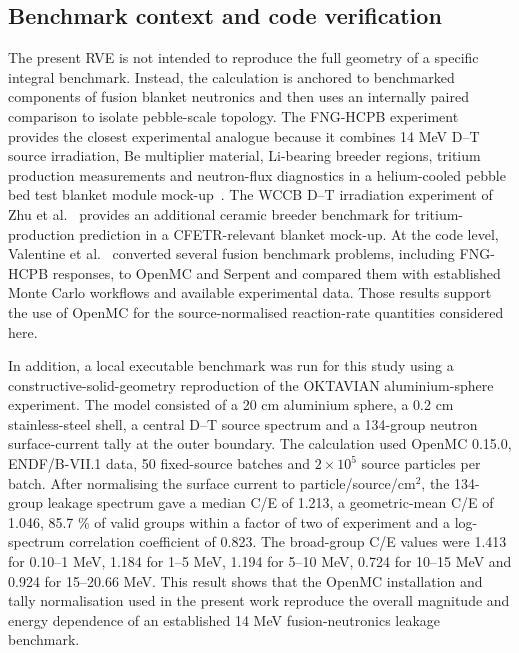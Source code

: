 \documentclass[preprint,12pt]{elsarticle}
\begin{document}
\subsection{Benchmark context and code verification}

The present RVE is not intended to reproduce the full geometry of a specific
integral benchmark.  Instead, the calculation is anchored to benchmarked
components of fusion blanket neutronics and then uses an internally paired
comparison to isolate pebble-scale topology.  The FNG-HCPB experiment provides
the closest experimental analogue because it combines 14 MeV D--T source
irradiation, Be multiplier material, Li-bearing breeder regions, tritium
production measurements and neutron-flux diagnostics in a helium-cooled pebble
bed test blanket module mock-up~\cite{batistoni2007}.  The WCCB D--T
irradiation experiment of Zhu et al.~\cite{zhu2021} provides an additional
ceramic breeder benchmark for tritium-production prediction in a
CFETR-relevant blanket mock-up.  At the code level, Valentine et al.~\cite{valentine2022}
converted several fusion benchmark problems, including FNG-HCPB responses, to
OpenMC and Serpent and compared them with established Monte Carlo workflows and
available experimental data.  Those results support the use of OpenMC for the
source-normalised reaction-rate quantities considered here.

In addition, a local executable benchmark was run for this study using a
constructive-solid-geometry reproduction of the OKTAVIAN aluminium-sphere
experiment.  The model consisted of a 20 cm aluminium sphere, a 0.2 cm
stainless-steel shell, a central D--T source spectrum and a 134-group neutron
surface-current tally at the outer boundary.  The calculation used OpenMC
0.15.0, ENDF/B-VII.1 data, 50 fixed-source batches and $2\times10^5$ source
particles per batch.  After normalising the surface current to
particle/source/cm$^2$, the 134-group leakage spectrum gave a median C/E of
1.213, a geometric-mean C/E of 1.046, 85.7 \% of valid groups within a factor
of two of experiment and a log-spectrum correlation coefficient of 0.823.  The
broad-group C/E values were 1.413 for 0.10--1 MeV, 1.184 for 1--5 MeV, 1.194
for 5--10 MeV, 0.724 for 10--15 MeV and 0.924 for 15--20.66 MeV.  This result
shows that the OpenMC installation and tally normalisation used in the present
work reproduce the overall magnitude and energy dependence of an established
14 MeV fusion-neutronics leakage benchmark.
\end{document}
